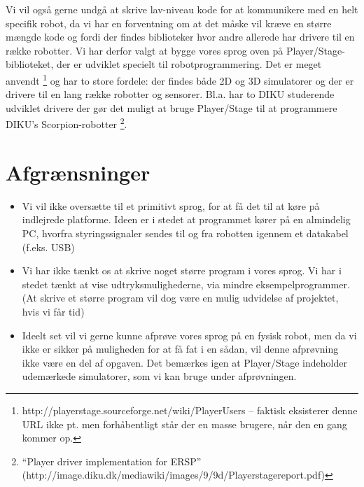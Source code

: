 \documentclass[a4paper,oneside, final]{memoir}
\begin{document}
Vi vil også gerne undgå at skrive lav-niveau kode for at kommunikere
med en helt specifik robot, da vi har en forventning om at det måske
vil kræve en større mængde kode og fordi der findes biblioteker hvor
andre allerede har drivere til en række robotter. Vi har derfor
valgt at bygge vores sprog oven på Player/Stage-biblioteket, der er udviklet
specielt til robotprogrammering. Det er meget anvendt
\footnote{http://playerstage.sourceforge.net/wiki/PlayerUsers --
  faktisk eksisterer denne URL ikke pt. men forhåbentligt står der en
  masse brugere, når den en gang kommer op.} og har to store fordele: der
findes både 2D og 3D simulatorer og der er drivere til en lang række
robotter og sensorer. Bl.a. har to DIKU studerende udviklet drivere
der gør det muligt at bruge Player/Stage til at programmere DIKU's
Scorpion-robotter \footnote{``Player driver implementation for ERSP''
  (http://image.diku.dk/mediawiki/images/9/9d/Playerstagereport.pdf)}.

\section{Afgrænsninger}
\begin{itemize}
\item Vi vil ikke oversætte til et primitivt sprog, for at få det til
  at køre på indlejrede platforme. Ideen er i stedet at programmet
  kører på en almindelig PC, hvorfra styringssignaler sendes til og fra
  robotten igennem et datakabel (f.eks. USB)
%
\item Vi har ikke tænkt os at skrive noget større program i vores
  sprog. Vi har i stedet tænkt at vise udtryksmulighederne, via mindre
  eksempelprogrammer. (At skrive et større program vil dog være en
  mulig udvidelse af projektet, hvis vi får tid)
\item Ideelt set vil vi gerne kunne afprøve vores sprog på en fysisk robot,
men da vi ikke er sikker på muligheden for at få fat i en sådan, vil
denne afprøvning ikke være en del af opgaven. Det bemærkes igen at
Player/Stage indeholder udemærkede simulatorer, som vi kan bruge under
afprøvningen.
\end{itemize}
\end{document}
